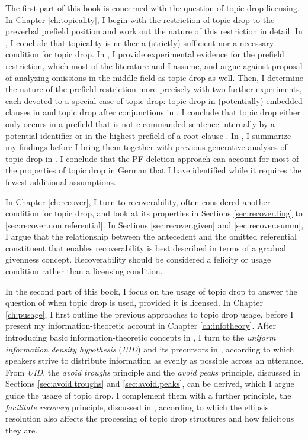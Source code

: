 The first part of this book is concerned with the question of topic drop licensing.
In Chapter \ref{ch:topicality}, I begin with the restriction of topic drop to the preverbal prefield position and work out the nature of this restriction in detail.
In , I conclude  that topicality is neither a (strictly) sufficient nor a necessary condition for topic drop.
In , I provide experimental evidence for the prefield restriction, which most of the literature and I assume, and argue against  proposal of analyzing omissions in the middle field  as topic drop as well.
Then, I determine the nature of the prefield restriction more precisely with two further experiments, each devoted to a special case of topic drop: topic drop in (potentially) embedded clauses in  and topic drop after conjunctions in .
I conclude that topic drop either only occurs in a prefield that is not c-commanded  sentence-internally by a potential identifier \citep{rizzi1994} or in the highest prefield of a root clause \citep{freywald2020}.
In , I summarize my findings before I bring them together with previous generative analyses of topic drop in .
I conclude that the PF deletion approach can account for most of the properties of topic drop in German that I have identified while it requires the fewest additional assumptions.

In Chapter \ref{ch:recover}, I turn to recoverability, often considered another condition for topic drop, and look at its properties in Sections \ref{sec:recover.ling} to \ref{sec:recover.non.referential}.
In Sections \ref{sec:recover.given} and \ref{sec:recover.summ}, I argue that the relationship between the antecedent and the omitted referential constituent that enables recoverability is best described in terms of a gradual givenness concept.
Recoverability should be considered a felicity or usage condition rather than a licensing condition.

In the second part of this book, I focus on the usage of topic drop to answer the question of when topic drop is used, provided it is licensed.
In Chapter \ref{ch:pusage}, I first outline the previous approaches to topic drop usage, before I present my information\hyp theoretic account in Chapter \ref{ch:infotheory}.
After introducing basic information\hyp theoretic concepts in , I turn to the \textit{uniform information density hypothesis} (\textit{UID}) and its precursors in , according to which speakers strive to distribute information as evenly as possible across an utterance.
From \textit{UID}, the \textit{avoid troughs} principle and the \textit{avoid peaks} principle, discussed in Sections \ref{sec:avoid.troughs} and \ref{sec:avoid.peaks}, can be derived, which I argue guide the usage of topic drop.
I complement them with a further principle, the \textit{facilitate recovery} principle, discussed in , according to which  the ellipsis resolution also affects the processing of topic drop structures and how felicitous they are. 

